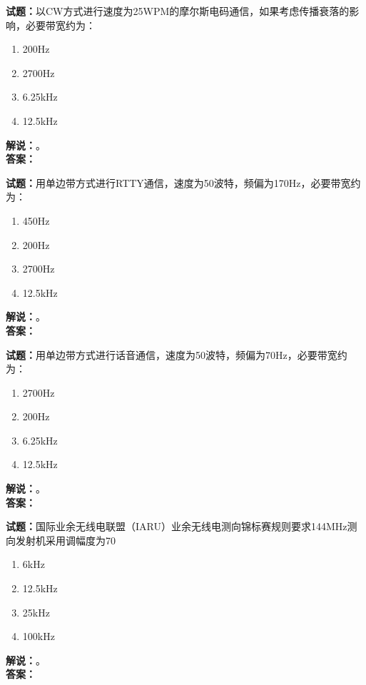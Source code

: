 \documentclass{ctexbook}
\begin{document}
\vspace{\baselineskip}

\noindent\textbf{试题：}以CW方式进行速度为25WPM的摩尔斯电码通信，如果考虑传播衰落的影响，必要带宽约为：
\begin{enumerate}[leftmargin=3em]
  \item 200Hz
  \item 2700Hz
  \item 6.25\unit{\kHz}
  \item 12.5\unit{\kHz}
\end{enumerate}
\noindent\textbf{解说：}\textbf{}。\\\noindent\textbf{答案：}

\vspace{\baselineskip}

\noindent\textbf{试题：}用单边带方式进行RTTY通信，速度为50波特，频偏为170Hz，必要带宽约为：
\begin{enumerate}[leftmargin=3em]
  \item 450Hz
  \item 200Hz
  \item 2700Hz
  \item 12.5\unit{\kHz}
\end{enumerate}
\noindent\textbf{解说：}\textbf{}。\\\noindent\textbf{答案：}

\vspace{\baselineskip}

\noindent\textbf{试题：}用单边带方式进行话音通信，速度为50波特，频偏为70Hz，必要带宽约为：
\begin{enumerate}[leftmargin=3em]
  \item 2700Hz
  \item 200Hz
  \item 6.25\unit{\kHz}
  \item 12.5\unit{\kHz}
\end{enumerate}
\noindent\textbf{解说：}\textbf{}。\\\noindent\textbf{答案：}

\vspace{\baselineskip}

\noindent\textbf{试题：}国际业余无线电联盟（IARU）业余无线电测向锦标赛规则要求144\unit{\MHz}测向发射机采用调幅度为70%
\begin{enumerate}[leftmargin=3em]
  \item 6\unit{\kHz}
  \item 12.5\unit{\kHz}
  \item 25\unit{\kHz}
  \item 100\unit{\kHz}
\end{enumerate}
\noindent\textbf{解说：}\textbf{}。\\\noindent\textbf{答案：}
\end{document}
